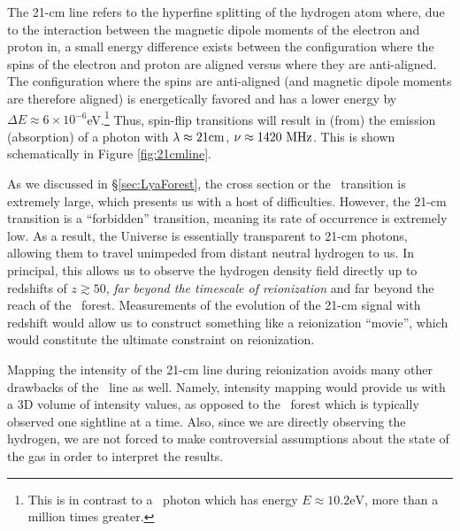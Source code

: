 The 21-cm line refers to the hyperfine splitting of the hydrogen atom where, due to the interaction between the magnetic dipole moments of the electron and proton in, a small energy difference exists between the configuration where the spins of the electron and proton are aligned versus where they are anti-aligned. The configuration where the spins are anti-aligned (and magnetic dipole moments are therefore aligned) is energetically favored and has a lower energy by $\Delta E \approx 6\times 10^{-6}$eV.\footnote{This is in contrast to a \lya\ photon which has energy $E \approx 10.2\text{eV}$, more than a million times greater.} Thus, spin-flip transitions will result in (from) the emission (absorption) of a photon with $\lambda \approx 21\text{cm}$, $\nu \approx 1420\ \text{MHz}$. This is shown schematically in Figure \ref{fig:21cmline}. 


As we discussed in \S \ref{sec:LyaForest}, the cross section or the \lya\ transition is extremely large, which presents us with a host of difficulties. However, the 21-cm transition is a ``forbidden'' transition, meaning its rate of occurrence is extremely low. As a result, the Universe is essentially transparent to 21-cm photons, allowing them to travel unimpeded from distant neutral hydrogen to us. In principal, this allows us to observe the hydrogen density field directly up to redshifts of $z \gtrsim 50$, \textit{far beyond the timescale of reionization} and far beyond the reach of the \lya\ forest. Measurements of the evolution of the 21-cm signal with redshift would allow us to construct something like a reionization ``movie'', which would constitute the ultimate constraint on reionization. 


Mapping the intensity of the 21-cm line during reionization avoids many other drawbacks of the \lya\ line as well. Namely, intensity mapping would provide us with a 3D volume of intensity values, as opposed to the \lya\ forest which is typically observed one sightline at a time. Also, since we are directly observing the hydrogen, we are not forced to make controversial assumptions about the state of the gas in order to interpret the results. 

